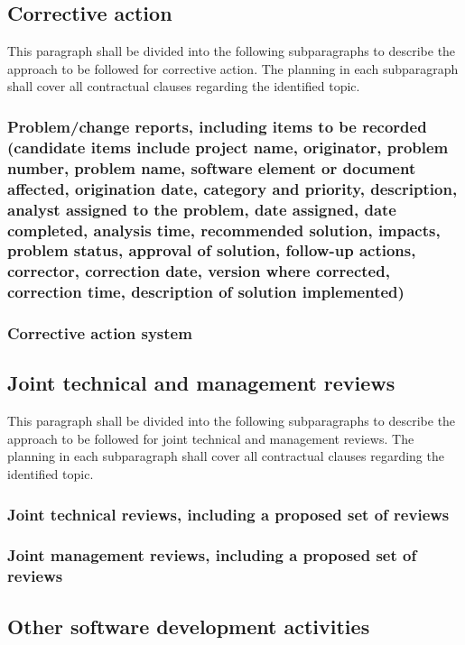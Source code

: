 \documentclass{fidata-report-template}
\begin{document}
\subsection{Corrective action}

This paragraph shall be divided into the following subparagraphs to
describe the approach to be followed for corrective action. The planning
in each subparagraph shall cover all contractual clauses regarding the
identified topic.

\subsubsection{Problem/change reports, including items to
be recorded (candidate items include project name, originator, problem
number, problem name, software element or document affected, origination
date, category and priority, description, analyst assigned to the
problem, date assigned, date completed, analysis time, recommended
solution, impacts, problem status, approval of solution, follow-up
actions, corrector, correction date, version where corrected, correction
time, description of solution implemented)}

\subsubsection{Corrective action system}

\subsection{Joint technical and management reviews}

This paragraph shall be divided into the following subparagraphs to
describe the approach to be followed for joint technical and management
reviews. The planning in each subparagraph shall cover all contractual
clauses regarding the identified topic.

\subsubsection{Joint technical reviews, including a proposed set of
reviews}

\subsubsection{Joint management reviews, including a proposed set of
reviews}

\subsection{Other software development activities}
\end{document}
